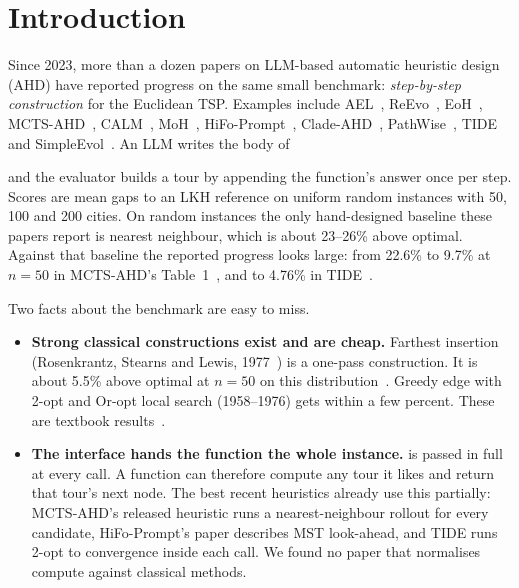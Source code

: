 \section{Introduction}
Since 2023, more than a dozen papers on LLM-based automatic heuristic design (AHD) have reported
progress on the same small benchmark: \emph{step-by-step construction} for the Euclidean TSP. Examples
include AEL~\cite{ael}, ReEvo~\cite{reevo}, EoH~\cite{eoh}, MCTS-AHD~\cite{mctsahd},
CALM~\cite{calm}, MoH~\cite{moh}, HiFo-Prompt~\cite{hifo}, Clade-AHD~\cite{clade},
PathWise~\cite{pathwise}, TIDE~\cite{tide} and SimpleEvol~\cite{simpleevol}. An LLM writes the body of
\begin{center}\end{center}
and the evaluator builds a tour by appending the function's answer once per step. Scores are mean
gaps to an LKH reference on uniform random instances with 50, 100 and 200 cities. On random
instances the only hand-designed baseline these papers report is nearest neighbour, which is about
23--26\% above optimal. Against that baseline the reported progress looks large: from 22.6\% to
9.7\% at $n=50$ in MCTS-AHD's Table~1~\cite{mctsahd}, and to 4.76\% in TIDE~\cite{tide}.

Two facts about the benchmark are easy to miss.
\begin{itemize}
\item \textbf{Strong classical constructions exist and are cheap.} Farthest insertion
(Rosenkrantz, Stearns and Lewis, 1977~\cite{rosenkrantz}) is a one-pass construction. It is about
5.5\% above optimal at $n=50$ on this distribution~\cite{kool}. Greedy edge with 2-opt and Or-opt
local search (1958--1976) gets within a few percent. These are textbook results~\cite{johnson}.
\item \textbf{The interface hands the function the whole instance.}  is
passed in full at every call. A function can therefore compute any tour it likes and return that
tour's next node. The best recent heuristics already use this partially: MCTS-AHD's released
heuristic runs a nearest-neighbour rollout for every candidate, HiFo-Prompt's paper describes MST look-ahead, and
TIDE runs 2-opt to convergence inside each call. We found no paper that normalises compute against classical methods.
\end{itemize}

